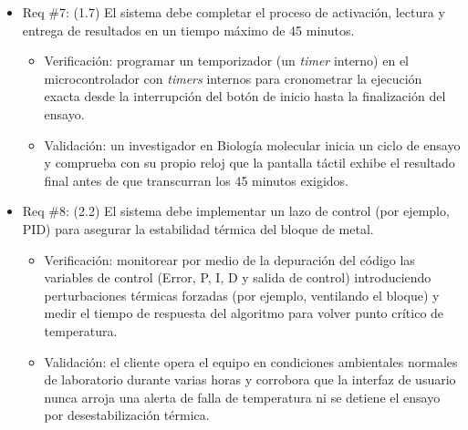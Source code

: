 \documentclass[
11pt, %
]{charter}
\begin{document}
\begin{itemize}
\item Req \#7: (1.7) El sistema debe completar el proceso de activación, lectura y entrega de resultados en un tiempo máximo de 45 minutos.

\begin{itemize}
	\item Verificación: programar un temporizador (un \textit{timer} interno) en el microcontrolador con \textit{timers} internos para cronometrar la ejecución exacta desde la interrupción del botón de inicio hasta la finalización del ensayo.
	\item Validación: un investigador en Biología molecular inicia un ciclo de ensayo y comprueba con su propio reloj que la pantalla táctil exhibe el resultado final antes de que transcurran los 45 minutos exigidos.
\end{itemize}

\end{itemize}


\begin{itemize}
\item Req \#8: (2.2) El sistema debe implementar un lazo de control (por ejemplo, PID) para asegurar la estabilidad térmica del bloque de metal.

\begin{itemize}
	\item Verificación: monitorear por medio de la depuración del código las variables de control (Error, P, I, D y salida de control)  introduciendo perturbaciones térmicas forzadas (por ejemplo, ventilando el bloque) y medir el tiempo de respuesta del algoritmo para volver punto crítico de temperatura.
	\item Validación: el cliente opera el equipo en condiciones ambientales normales de laboratorio durante varias horas y corrobora que la interfaz de usuario nunca arroja una alerta de falla de temperatura ni se detiene el ensayo por desestabilización térmica.
\end{itemize}

\end{itemize}
\end{document}
